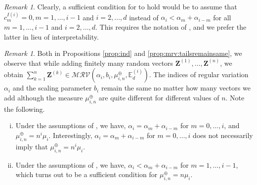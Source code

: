 \documentclass[aos]{imsart}
\numberwithin{equation}{section}
\theoremstyle{plain} %
\theoremstyle{remark}
\newtheorem{remark}[theorem]{Remark}
\newcommand{\E}{\mathbb{E}}
\def\MRV{\mathcal{MRV}}
\def\bZ{\boldsymbol Z}
\begin{document}
\begin{remark}
Clearly,  a sufficient condition for  to hold would be to assume that $c_m^{I(i)}=0, m=1, \ldots, i-1$ and $i = 2,\ldots,d$ instead of  $\alpha_i<\alpha_m+\alpha_{i-m}$ for all $m= 1,\ldots, i-1$ and $i = 2,\ldots,d$. This requires the notation of , and we prefer the latter in lieu of interpretability.
\end{remark}

\begin{remark}
Both in  Propositions \ref{prop:ind} and  \ref{prop:mrv:tailsremainsame}, we observe that while adding finitely many  random vectors $\bZ^{(1)}, \ldots, \bZ^{(n)}$, we obtain $\sum_{k=1}^n \bZ^{(k)} \in \MRV(\alpha_i,b_i, \mu_{i,n}^{\oplus}, \E_d^{(i)})$. The  indices of regular variation $\alpha_i$ and the scaling parameter $b_i$ remain the same no matter how many vectors we add although the measure $\mu_{i,n}^{\oplus}$ are quite different for different values of $n$. Note the following.
\begin{enumerate}[i)]
    \item Under the assumptions of , we have, $\alpha_i=\alpha_{m}+\alpha_{i-m}$ for {$m=0,\ldots,i$,}  and  $\mu_{i,n}^{\oplus}=n^i\mu_i$. Interestingly,  $\alpha_i=\alpha_{m}+\alpha_{i-m}$ for {$m=0,\ldots, i$} does not necessarily imply that $\mu_{i,n}^{\oplus}=n^i\mu_i$.
    \item Under the assumptions of , we have, $\alpha_i <\alpha_{m}+\alpha_{i-m}$ for {$m=1,\ldots,i-1$,}  which turns out to be a sufficient condition for $\mu_{i,n}^{\oplus}=n\mu_i$.
\end{enumerate}
\end{remark}
\end{document}
